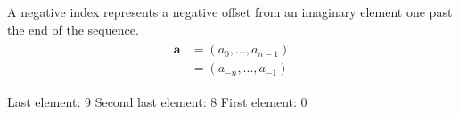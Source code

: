 \documentclass[letterpaper,10pt,english]{sphinxmanual}
\begin{document}
A negative index represents a negative offset from an imaginary element one past the end of the sequence.
\begin{equation*}
\begin{split}\begin{aligned} \boldsymbol{a} &= (a_0, ... , a_{n-1})\\
& = (a_{-n}, ..., a_{-1})
\end{aligned}\end{split}
\end{equation*}
\begin{sphinxVerbatim}[commandchars=\\\{\}]
  \PYG{p}{[}\PYG{p}{]}
\PYG{p}{[}\PYG{p}{]}
\PYG{p}{[}\PYG{p}{]}
\PYG{p}{[}\PYG{p}{]}
\PYG{p}{[}\PYG{p}{]} 
\end{sphinxVerbatim}

\begin{sphinxVerbatim}[commandchars=\\\{\}]
[0, 1, 2, 3, 4, 5, 6, 7, 8, 9]
Last element: 9
Second last element: 8
First element: 0
\end{sphinxVerbatim}
\end{document}
